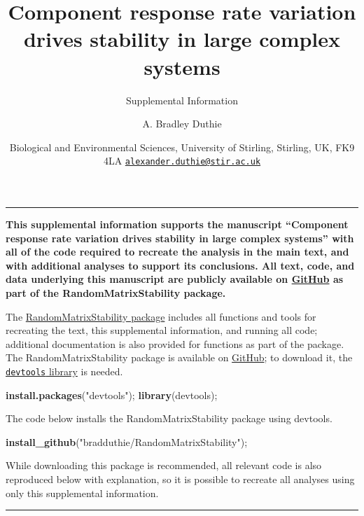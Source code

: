 \documentclass[]{article}
\title{Component response rate variation drives stability in large complex
systems}
\subtitle{Supplemental Information}
\author{A. Bradley Duthie}
\date{Biological and Environmental Sciences, University of Stirling, Stirling,
UK, FK9 4LA
\href{mailto:alexander.duthie@stir.ac.uk}{\nolinkurl{alexander.duthie@stir.ac.uk}}}
\newenvironment{Shaded}{\begin{snugshade}}{\end{snugshade}}
\newcommand{\KeywordTok}[1]{\textcolor[rgb]{0.13,0.29,0.53}{\textbf{{#1}}}}
\newcommand{\StringTok}[1]{\textcolor[rgb]{0.31,0.60,0.02}{{#1}}}
\newcommand{\NormalTok}[1]{{#1}}
\begin{document}
\maketitle

\begin{center}\rule{0.5\linewidth}{\linethickness}\end{center}

\textbf{This supplemental information supports the manuscript
``Component response rate variation drives stability in large complex
systems'' with all of the code required to recreate the analysis in the
main text, and with additional analyses to support its conclusions. All
text, code, and data underlying this manuscript are publicly available
on \href{https://github.com/bradduthie/RandomMatrixStability}{GitHub} as
part of the RandomMatrixStability package.}

The
\href{https://github.com/bradduthie/RandomMatrixStability}{RandomMatrixStability
package} includes all functions and tools for recreating the text, this
supplemental information, and running all code; additional documentation
is also provided for functions as part of the package. The
RandomMatrixStability package is available on
\href{https://github.com/bradduthie/RandomMatrixStability}{GitHub}; to
download it, the
\href{https://cran.r-project.org/web/packages/devtools/index.html}{\texttt{devtools}
library} is needed.

\begin{Shaded}
\begin{Highlighting}[]
\KeywordTok{install.packages}\NormalTok{(}\StringTok{"devtools"}\NormalTok{);}
\KeywordTok{library}\NormalTok{(devtools);}
\end{Highlighting}
\end{Shaded}

The code below installs the RandomMatrixStability package using
devtools.

\begin{Shaded}
\begin{Highlighting}[]
\KeywordTok{install_github}\NormalTok{(}\StringTok{"bradduthie/RandomMatrixStability"}\NormalTok{);}
\end{Highlighting}
\end{Shaded}

While downloading this package is recommended, all relevant code is also
reproduced below with explanation, so it is possible to recreate all
analyses using only this supplemental information.

\begin{center}\rule{0.5\linewidth}{\linethickness}\end{center}
\end{document}
